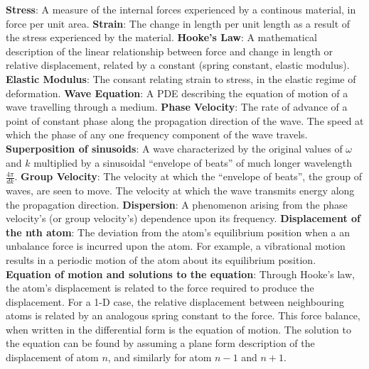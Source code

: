 \documentclass{article}
\numberwithin{equation}{section}
\begin{document}
\textbf{Stress}: A measure of the internal forces experienced by a continous material, in force per unit area. 
\newline
\textbf{Strain}: The change in length per unit length as a result of the stress experienced by the material.
\newline
\textbf{Hooke's Law}: A mathematical description of the linear relationship between force and change in length or relative displacement, related by a constant (spring constant, elastic modulus). 
\newline
\textbf{Elastic Modulus}: The consant relating strain to stress, in the elastic regime of deformation.
\newline
\textbf{Wave Equation}: A PDE describing the equation of motion of a wave travelling through a medium.
\newline
\textbf{Phase Velocity}: The rate of advance of a point of constant phase along the propagation direction of the wave. The speed at which the phase of any one frequency component of the wave travels.
\newline
\textbf{Superposition of sinusoids}: A wave characterized by the original values of $\omega$ and $k$ multiplied by a sinusoidal ``envelope of beats'' of much longer wavelength $\frac{4 \pi}{dk}$.
\newline
\textbf{Group Velocity}: The velocity at which the ``envelope of beats'', the group of waves, are seen to move. The velocity at which the wave transmits energy along the propagation direction.
\newline
\textbf{Dispersion}: A phenomenon arising from the phase velocity's (or group velocity's) dependence upon its frequency.
\newline
\textbf{Displacement of the nth atom}: The deviation from the atom's equilibrium position when a an unbalance force is incurred upon the atom. For example, a vibrational motion results in a periodic motion of the atom about its equilibrium position.
\newline
\textbf{Equation of motion and solutions to the equation}: Through Hooke's law, the atom's displacement is related to the force required to produce the displacement. For a 1-D case, the relative displacement between neighbouring atoms is related by an analogous spring constant to the force. This force balance, when written in the differential form is the equation of motion. The solution to the equation can be found by assuming a plane form description of the displacement of atom $n$, and similarly for atom $n-1$ and $n+1$. 
\end{document}
